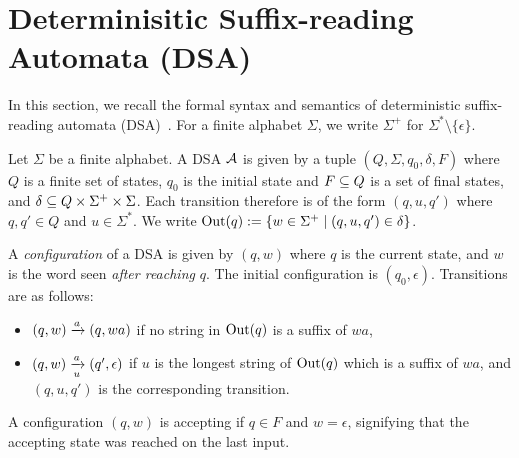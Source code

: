 \newcommand{\lt}{\ell}
\newcommand{\rt}{r}

\section{Determinisitic Suffix-reading Automata (DSA)}
\label{sec:prelims}

In this section, we recall the formal syntax and semantics of deterministic suffix-reading automata (DSA)~\cite{DBLP:journals/corr/abs-2410-22761}. For a finite alphabet $\Sigma$, we write $\Sigma^+$ for $\Sigma^* \setminus \{\epsilon\}$. %

\begin{definition}
Let $\Sigma$ be a finite alphabet. A DSA $\mathcal{A}$ is given by a tuple $(Q, \Sigma, q_0, \delta, F)$ where $Q$ is a finite set of states, $q_0$ is the initial state and $F \subseteq Q$ is a set of final states, and $\delta \subseteq Q \times \Sigma^+ \times \Sigma$. Each transition therefore is of the form $(q, u, q')$ where $q, q' \in Q$ and $u \in \Sigma^*$. We write $\operatorname{Out}(q) := \{ w \in \Sigma^+ \mid (q, u, q') \in \delta \}$.
\end{definition}

A \emph{configuration} of a DSA is given by $(q, w)$ where $q$ is the current state, and $w$ is the word seen \emph{after reaching} $q$. The initial configuration is $(q_0, \epsilon)$. Transitions are as follows:
\begin{itemize}
\item $(q, w) \xrightarrow{a} (q, wa)$ if no string in $\operatorname{Out}(q)$ is a suffix of $wa$,
\item $(q, w) \xrightarrow[u]{a} (q', \epsilon)$ if $u$ is the longest string of $\operatorname{Out}(q)$ which is a suffix of $wa$, and $(q, u, q')$ is the corresponding transition. 
\end{itemize}
A configuration $(q, w)$ is accepting if $q \in F$ and $w = \epsilon$, signifying that the accepting state was reached on the last input.


